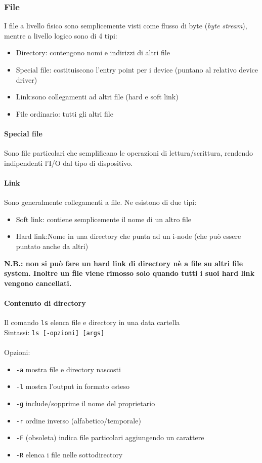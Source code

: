 \documentclass[a4paper]{article}
\begin{document}
\subsubsection{File}
I file a livello fisico sono semplicemente visti come flusso di byte (\textit{byte stream}), mentre a livello logico sono di 4 tipi:
\begin{itemize}
\item Directory: contengono nomi e indirizzi di altri file
\item Special file: costituiscono l'entry point per i device (puntano al relativo device driver)
\item Link:sono collegamenti ad altri file (hard e soft link)
\item File ordinario: tutti gli altri file
\end{itemize}
\paragraph{Special file} Sono file particolari che semplificano le operazioni di lettura/scrittura, rendendo indipendenti l'I/O dal tipo di dispositivo.
\paragraph{Link}
Sono generalmente collegamenti a file. Ne esistono di due tipi:
\begin{itemize}
\item Soft link: contiene semplicemente il nome di un altro file
\item Hard link:Nome in una directory che punta ad un i-node (che può essere puntato anche da altri)
\end{itemize}
\textbf{N.B.: non si può fare un hard link di directory nè a file su altri file system. Inoltre un file viene rimosso solo quando tutti i suoi hard link vengono cancellati.}

\paragraph{Contenuto di directory}Il comando \verb|ls| elenca file e directory in una data cartella \\
Sintassi: \verb|ls [-opzioni] [args]| \\ \\
Opzioni:
\begin{itemize}
\item \verb|-a| mostra file e directory nascosti
\item \verb|-l| mostra l'output in formato esteso
\item \verb|-g| include/sopprime il nome del proprietario
\item \verb|-r| ordine inverso (alfabetico/temporale)
\item \verb|-F| (obsoleta) indica file particolari aggiungendo un carattere
\item \verb|-R| elenca i file nelle sottodirectory
\end{itemize}
\end{document}
